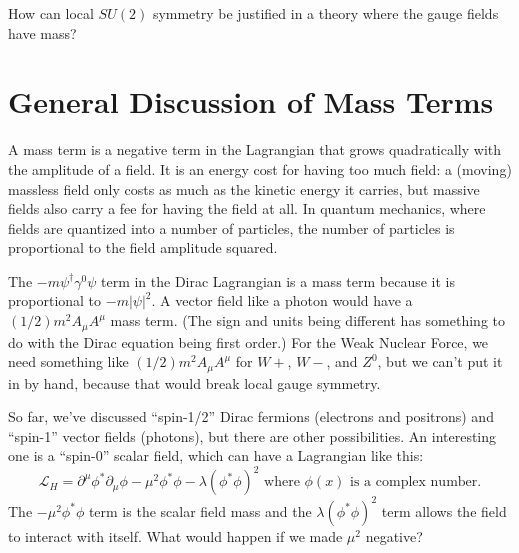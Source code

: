 \documentclass[12pt]{article}
\begin{document}
How can local $SU(2)$ symmetry be justified in a theory where the
gauge fields have mass?

\section{General Discussion of Mass Terms}

A mass term is a negative term in the Lagrangian that grows
quadratically with the amplitude of a field.  It is an energy
cost for having too much field: a (moving) massless field only costs
as much as the kinetic energy it carries, but massive fields also
carry a fee for having the field at all.  In quantum mechanics, where
fields are quantized into a number of particles, the number of
particles is proportional to the field amplitude squared.

The $-m\psi^\dagger \gamma^0 \psi$ term in the Dirac Lagrangian is a
mass term because it is proportional to $-m|\psi|^2$.  A vector field
like a photon would have a $(1/2) m^2 A_\mu A^\mu$ mass term.  (The
sign and units being different has something to do with the Dirac equation
being first order.)  For the Weak Nuclear Force, we need something
like $(1/2) m^2 A_\mu A^\mu$ for $W+$, $W-$, and $Z^0$, but we can't
put it in by hand, because that would break local gauge symmetry.

So far, we've discussed ``spin-1/2'' Dirac fermions (electrons and
positrons) and ``spin-1'' vector fields (photons), but there are other
possibilities.  An interesting one is a ``spin-0'' scalar field, which
can have a Lagrangian like this:
\begin{equation}
  \label{higgslagrangian}
  \mathcal{L}_H = \partial^\mu \phi^* \partial_\mu \phi - \mu^2
  \phi^*\phi - \lambda (\phi^* \phi)^2 \mbox{ where $\phi(x)$ is a
  complex number.}
\end{equation}
The $-\mu^2 \phi^*\phi$ term is the scalar field mass and the $\lambda
(\phi^* \phi)^2$ term allows the field to interact with itself. What
would happen if we made $\mu^2$ negative?
\end{document}
